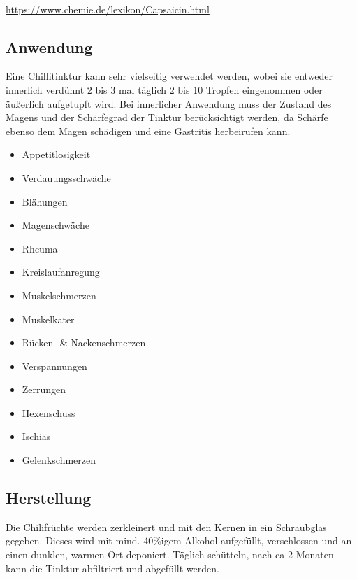 \cite{tinkturen}  ~\cite{heilkraeuterlexikon}

\url{https://www.chemie.de/lexikon/Capsaicin.html}

\subsection{Anwendung}

Eine Chillitinktur kann sehr vielseitig verwendet werden, wobei sie entweder innerlich verdünnt 2 bis 3  mal täglich 2 bis 10 Tropfen eingenommen oder äußerlich aufgetupft wird. Bei innerlicher Anwendung muss der Zustand des Magens und der Schärfegrad der Tinktur berücksichtigt werden, da Schärfe ebenso dem Magen schädigen und eine Gastritis herbeirufen kann. 

               

\begin{itemize}
	\item Appetitlosigkeit
	\item Verdauungsschwäche
	\item Blähungen
	\item Magenschwäche
	\item Rheuma
	\item Kreislaufanregung
	\item Muskelschmerzen
	\item Muskelkater
	\item Rücken- \& Nackenschmerzen
	\item Verspannungen
	\item Zerrungen
	\item Hexenschuss
	\item Ischias
	\item Gelenkschmerzen 
\end{itemize}

\subsection{Herstellung}

Die Chilifrüchte werden zerkleinert und mit den Kernen in ein Schraubglas gegeben. Dieses wird mit mind. 40\%igem Alkohol aufgefüllt, verschlossen und an einen dunklen, warmen Ort deponiert. Täglich schütteln, nach ca 2 Monaten kann die Tinktur abfiltriert und abgefüllt werden.

